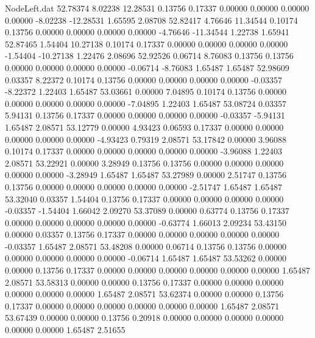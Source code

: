 \begin{filecontents}{NodeLeft.dat}
  52.78374    8.02238   12.28531     0.13756    0.17337    0.00000    0.00000    0.00000    0.00000   -8.02238  -12.28531    1.65595    2.08708
  52.82417    4.76646   11.34544     0.10174    0.13756    0.00000    0.00000    0.00000    0.00000   -4.76646  -11.34544    1.22738    1.65941
  52.87465    1.54404   10.27138     0.10174    0.17337    0.00000    0.00000    0.00000    0.00000   -1.54404  -10.27138    1.22476    2.08696
  52.92526    0.06714    8.76083     0.13756    0.13756    0.00000    0.00000    0.00000    0.00000   -0.06714   -8.76083    1.65487    1.65487
  52.98609    0.03357    8.22372     0.10174    0.13756    0.00000    0.00000    0.00000    0.00000   -0.03357   -8.22372    1.22403    1.65487
  53.03661    0.00000    7.04895     0.10174    0.13756    0.00000    0.00000    0.00000    0.00000    0.00000   -7.04895    1.22403    1.65487
  53.08724    0.03357    5.94131     0.13756    0.17337    0.00000    0.00000    0.00000    0.00000   -0.03357   -5.94131    1.65487    2.08571
  53.12779    0.00000    4.93423     0.06593    0.17337    0.00000    0.00000    0.00000    0.00000    0.00000   -4.93423    0.79319    2.08571
  53.17842    0.00000    3.96088     0.10174    0.17337    0.00000    0.00000    0.00000    0.00000    0.00000   -3.96088    1.22403    2.08571
  53.22921    0.00000    3.28949     0.13756    0.13756    0.00000    0.00000    0.00000    0.00000    0.00000   -3.28949    1.65487    1.65487
  53.27989    0.00000    2.51747     0.13756    0.13756    0.00000    0.00000    0.00000    0.00000    0.00000   -2.51747    1.65487    1.65487
  53.32040    0.03357    1.54404     0.13756    0.17337    0.00000    0.00000    0.00000    0.00000   -0.03357   -1.54404    1.66042    2.09270
  53.37089    0.00000    0.63774     0.13756    0.17337    0.00000    0.00000    0.00000    0.00000    0.00000   -0.63774    1.66013    2.09234
  53.43150    0.00000    0.03357     0.13756    0.17337    0.00000    0.00000    0.00000    0.00000    0.00000   -0.03357    1.65487    2.08571
  53.48208    0.00000    0.06714     0.13756    0.13756    0.00000    0.00000    0.00000    0.00000    0.00000   -0.06714    1.65487    1.65487
  53.53262    0.00000    0.00000     0.13756    0.17337    0.00000    0.00000    0.00000    0.00000    0.00000    0.00000    1.65487    2.08571
  53.58313    0.00000    0.00000     0.13756    0.17337    0.00000    0.00000    0.00000    0.00000    0.00000    0.00000    1.65487    2.08571
  53.62374    0.00000    0.00000     0.13756    0.17337    0.00000    0.00000    0.00000    0.00000    0.00000    0.00000    1.65487    2.08571
  53.67439    0.00000    0.00000     0.13756    0.20918    0.00000    0.00000    0.00000    0.00000    0.00000    0.00000    1.65487    2.51655

\end{filecontents}
